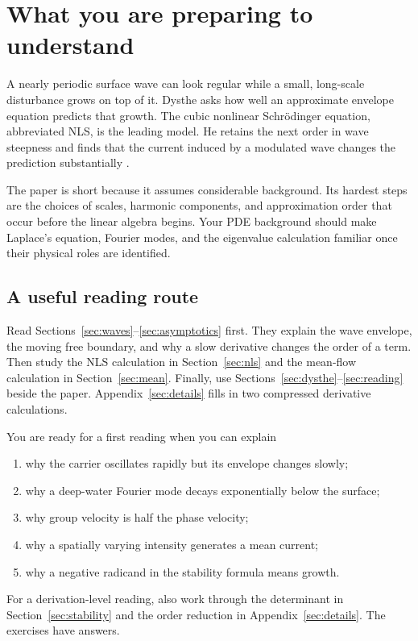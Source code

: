 \section{What you are preparing to understand}
\label{sec:orientation}

A nearly periodic surface wave can look regular while a small, long-scale
disturbance grows on top of it. Dysthe asks how well an approximate envelope
equation predicts that growth. The cubic nonlinear Schr\"odinger equation,
abbreviated NLS, is the leading model. He retains the next order in wave
steepness and finds that the current induced by a modulated wave changes
the prediction substantially \cite{dysthe}.

The paper is short because it assumes considerable background. Its hardest
steps are the choices of scales, harmonic components, and approximation order
that occur before the linear algebra begins. Your PDE background should make
Laplace's equation, Fourier modes, and the eigenvalue calculation familiar
once their physical roles are identified.

\subsection{A useful reading route}
Read Sections~\ref{sec:waves}--\ref{sec:asymptotics} first. They explain the
wave envelope, the moving free boundary, and why a slow derivative changes
the order of a term. Then study the NLS calculation in
Section~\ref{sec:nls} and the mean-flow calculation in
Section~\ref{sec:mean}. Finally, use
Sections~\ref{sec:dysthe}--\ref{sec:reading} beside the paper.
Appendix~\ref{sec:details} fills in two compressed derivative calculations.

You are ready for a first reading when you can explain
\begin{enumerate}
\item why the carrier oscillates rapidly but its envelope changes slowly;
\item why a deep-water Fourier mode decays exponentially below the surface;
\item why group velocity is half the phase velocity;
\item why a spatially varying intensity generates a mean current;
\item why a negative radicand in the stability formula means growth.
\end{enumerate}
For a derivation-level reading, also work through the determinant in
Section~\ref{sec:stability} and the order reduction in
Appendix~\ref{sec:details}. The exercises have answers.

